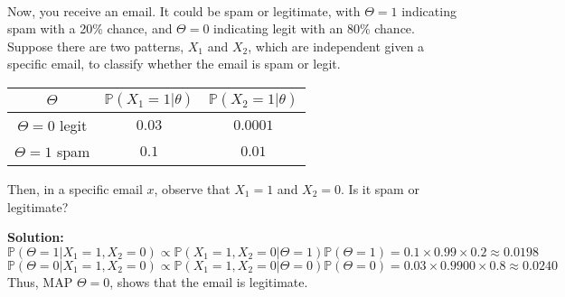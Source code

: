 \begin{eg}~

  Now, you receive an email. It could be spam or legitimate, with \(\Theta = 1\) indicating spam with a 20\% chance, and \(\Theta = 0\) indicating legit with an 80\% chance. Suppose there are two patterns, \(X_1\) and \(X_2\), which are independent given a specific email, to classify whether the email is spam or legit.

  \begin{table}[H]
    \centering
    \begin{tabular}{c|c|c}
        \toprule
        \(\Theta\) & \(\mathbb{P}(X_1 = 1 \vert \theta)\) & \(\mathbb{P}(X_2 = 1 \vert \theta)\)  \\
      \midrule
        \(\Theta = 0\) legit & \(0.03\) & \(0.0001\)  \\
        \(\Theta = 1\) spam & \(0.1\) & \(0.01\)  \\
        \bottomrule
    \end{tabular}
  \end{table}
  Then, in a specific email \(x\), observe that \(X_1 = 1\) and \(X_2 = 0\). Is it spam or legitimate?

  \textbf{Solution:} 
  \[
    \mathbb{P}(\Theta = 1 \vert X_1 = 1, X_2 = 0) \propto \mathbb{P}(X_1 = 1, X_2 = 0 \vert \Theta = 1)\mathbb{P}(\Theta = 1) = 0.1 \times 0.99 \times 0.2 \approx 0.0198
  \]
  \[
    \mathbb{P}(\Theta = 0 \vert X_1 = 1, X_2 = 0) \propto \mathbb{P}(X_1 = 1, X_2 = 0 \vert \Theta = 0)\mathbb{P}(\Theta = 0) = 0.03 \times 0.9900 \times 0.8 \approx 0.0240
  \]
  Thus, MAP \(\Theta = 0\), shows that the email is legitimate. 
\end{eg}


